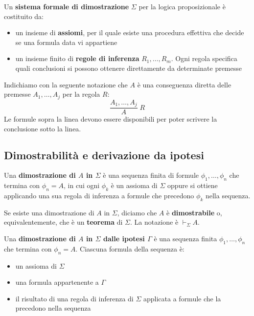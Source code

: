 \medskip
\noindent
\colorbox{SALZO}{\parbox{\dimexpr\linewidth-2\fboxsep}{
\begin{definition}
    Un \textbf{sistema formale di dimostrazione} $\Sigma$ per la logica
    proposizionale è costituito da:
    \begin{itemize}
        \item un insieme di \textbf{assiomi}, per il quale esiste una
        procedura effettiva che decide se una formula data vi appartiene
        \item un insieme finito di \textbf{regole di inferenza}
        $R_1,\ldots,R_m$. Ogni regola specifica quali conclusioni si
        possono ottenere direttamente da determinate premesse
    \end{itemize}
\end{definition}
}}%

\medskip
\noindent
Indichiamo con la seguente notazione che $A$ è una conseguenza diretta
delle premesse $A_1,\ldots,A_j$ per la regola $R$:
\[
    \frac{A_1,\ldots,A_j}{A}\;R
\]
Le formule sopra la linea devono essere disponibili per poter scrivere
la conclusione sotto la linea.

\subsection{Dimostrabilità e derivazione da ipotesi}

\noindent
\colorbox{SALZO}{\parbox{\dimexpr\linewidth-2\fboxsep}{
\begin{definition}
    Una \textbf{dimostrazione di $A$ in $\Sigma$} è una sequenza finita
    di formule $\phi_1,\ldots,\phi_n$ che termina con $\phi_n=A$,
    in cui ogni $\phi_k$ è un assioma di $\Sigma$ oppure si ottiene
    applicando una sua regola di inferenza a formule che precedono
    $\phi_k$ nella sequenza.
\end{definition}
}}%

\medskip
\noindent
Se esiste una dimostrazione di $A$ in $\Sigma$, diciamo che $A$ è
\textbf{dimostrabile} o, equivalentemente, che è un \textbf{teorema}
di $\Sigma$. La notazione è $\vdash_\Sigma A$.

\medskip
\noindent
\colorbox{SALZO}{\parbox{\dimexpr\linewidth-2\fboxsep}{
\begin{definition}
    Una \textbf{dimostrazione di $A$ in $\Sigma$ dalle ipotesi $\Gamma$}
    è una sequenza finita $\phi_1,\ldots,\phi_n$ che termina con
    $\phi_n=A$. Ciascuna formula della sequenza è:
    \begin{itemize}[label=--]
        \item un assioma di $\Sigma$
        \item una formula appartenente a $\Gamma$
        \item il risultato di una regola di inferenza di $\Sigma$
        applicata a formule che la precedono nella sequenza
    \end{itemize}
\end{definition}
}}%


